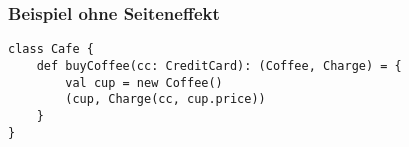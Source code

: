 	\section*{}
		\begin{frame}[fragile]
		\frametitle{Beispiel ohne Seiteneffekt}
		\begin{lstlisting}[style=myScalastyle]
class Cafe {
	def buyCoffee(cc: CreditCard): (Coffee, Charge) = {
		val cup = new Coffee()
		(cup, Charge(cc, cup.price))
	}
}
\end{lstlisting}
\end{frame}